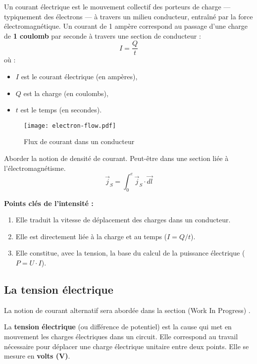 Un courant électrique est le mouvement collectif des porteurs de charge —
typiquement des électrons — à travers un milieu conducteur, entraîné par
la force électromagnétique.
Un courant de 1 ampère correspond au passage d’une charge de \textbf{1 coulomb}
par seconde à travers une section de conducteur :
\[
  I = \frac{Q}{t}
\]
où :
\begin{itemize}
  \item \(I\) est le courant électrique (en ampères),
  \item \(Q\) est la charge (en coulombs),
  \item \(t\) est le temps (en secondes).
\end{itemize}

\begin{figure}[H]
    \texttt{[image: electron-flow.pdf]}
    \caption{Flux de courant dans un conducteur}
\end{figure}
\begin{Todo}
	Aborder la notion de densité de courant. Peut-\^etre dans une section li\'ee \`a l'\'electromagn\'etisme.
	\[
	\vec{j}_S=\int_0^e\vec{j}_S\cdot\vec{dl}
	\]
\end{Todo}

\begin{Note}
\vspace{\baselineskip}
\textbf{Points clés de l’intensité :}
\begin{enumerate}
  \item Elle traduit la vitesse de déplacement des charges dans un conducteur.
  \item Elle est directement liée à la charge et au temps (\(I = Q/t\)).
  \item Elle constitue, avec la tension, la base du calcul de la puissance électrique (\(P = U \cdot I\)).
\end{enumerate}
\end{Note}

\subsection{La tension électrique}
\begin{Note}
	La notion de courant alternatif sera abordée dans la section (Work In Progress) .
\end{Note}

La \textbf{tension électrique} (ou différence de potentiel) est la cause
qui met en mouvement les charges électriques dans un circuit. Elle
correspond au travail nécessaire pour déplacer une charge électrique
unitaire entre deux points. Elle se mesure en \textbf{volts
(\unit{\volt})}.


